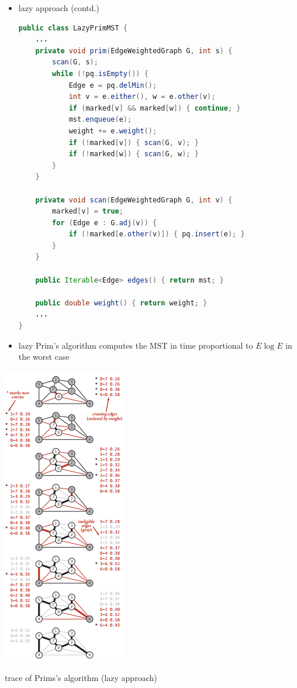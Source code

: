 \documentclass[8pt,a4paper,compress]{beamer}
\begin{document}
\begin{frame}[fragile]
\begin{minipage}{240pt}
\begin{itemize}
\item lazy approach (contd.) 
\begin{lstlisting}[language=Java]
public class LazyPrimMST {
    ...
    private void prim(EdgeWeightedGraph G, int s) {
        scan(G, s);
        while (!pq.isEmpty()) { 
            Edge e = pq.delMin(); 
            int v = e.either(), w = e.other(v);  
            if (marked[v] && marked[w]) { continue; }  
            mst.enqueue(e); 
            weight += e.weight();
            if (!marked[v]) { scan(G, v); }  
            if (!marked[w]) { scan(G, w); } 
        }
    }

    private void scan(EdgeWeightedGraph G, int v) {
        marked[v] = true;
        for (Edge e : G.adj(v)) {
            if (!marked[e.other(v)]) { pq.insert(e); }
        }
    }
    
    public Iterable<Edge> edges() { return mst; }

    public double weight() { return weight; }
    ...
}
\end{lstlisting}

\item lazy Prim's algorithm computes the MST in time proportional
to $E \log E$ in the worst case
\end{itemize}
\end{minipage}%
\begin{minipage}{90pt}
\begin{center}
\includegraphics[scale=0.4]{./figures/mst5.png}

\smallskip

\tiny trace of Prims's algorithm (lazy approach)
\end{center}
\end{minipage}
\end{frame}
\end{document}
